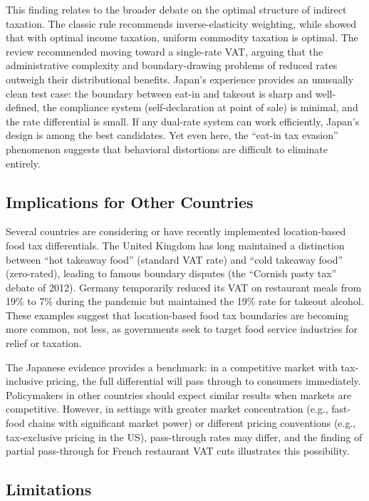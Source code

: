 \documentclass[12pt]{article}
\begin{document}
This finding relates to the broader debate on the optimal structure of indirect taxation. The classic \citet{ramsey1927contribution} rule recommends inverse-elasticity weighting, while \citet{atkinson1976design} showed that with optimal income taxation, uniform commodity taxation is optimal. The \citet{mirrlees2011tax} review recommended moving toward a single-rate VAT, arguing that the administrative complexity and boundary-drawing problems of reduced rates outweigh their distributional benefits. Japan's experience provides an unusually clean test case: the boundary between eat-in and takeout is sharp and well-defined, the compliance system (self-declaration at point of sale) is minimal, and the rate differential is small. If any dual-rate system can work efficiently, Japan's design is among the best candidates. Yet even here, the ``eat-in tax evasion'' phenomenon suggests that behavioral distortions are difficult to eliminate entirely.

\subsection{Implications for Other Countries}

Several countries are considering or have recently implemented location-based food tax differentials. The United Kingdom has long maintained a distinction between ``hot takeaway food'' (standard VAT rate) and ``cold takeaway food'' (zero-rated), leading to famous boundary disputes (the ``Cornish pasty tax'' debate of 2012). Germany temporarily reduced its VAT on restaurant meals from 19\% to 7\% during the pandemic but maintained the 19\% rate for takeout alcohol. These examples suggest that location-based food tax boundaries are becoming more common, not less, as governments seek to target food service industries for relief or taxation.

The Japanese evidence provides a benchmark: in a competitive market with tax-inclusive pricing, the full differential will pass through to consumers immediately. Policymakers in other countries should expect similar results when markets are competitive. However, in settings with greater market concentration (e.g., fast-food chains with significant market power) or different pricing conventions (e.g., tax-exclusive pricing in the US), pass-through rates may differ, and the \citet{benzarti2019really} finding of partial pass-through for French restaurant VAT cuts illustrates this possibility.

\subsection{Limitations}
\end{document}
